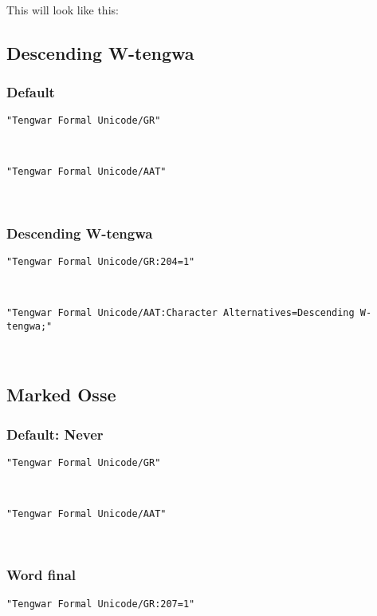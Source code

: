 \documentclass[11pt,a4paper]{article}
\begin{document}
\paragraph{} This will look like this: \myformal   \normalfont


\subsection{Descending W-tengwa}

\subsubsection{Default}

\noindent \texttt{"Tengwar Formal Unicode/GR"}

\formalGR  

\noindent \texttt{"Tengwar Formal Unicode/AAT"}

\formalAAT  

\subsubsection{Descending W-tengwa}

\texttt{"Tengwar Formal Unicode/GR:204=1"}

\formalGRdescw  

\noindent \texttt{"Tengwar Formal Unicode/AAT:Character Alternatives=Descending W-tengwa;"}

\formalAATdescw  


\subsection{Marked Osse}

\subsubsection{Default: Never}

\texttt{"Tengwar Formal Unicode/GR"}

\formalGR 

\noindent \texttt{"Tengwar Formal Unicode/AAT"}

\formalAAT 

\subsubsection{Word final}

\texttt{"Tengwar Formal Unicode/GR:207=1"}
\end{document}

